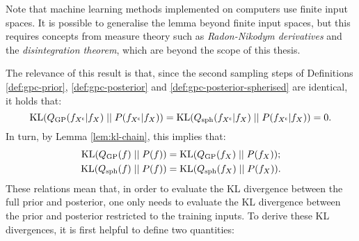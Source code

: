 \begin{refsection}
Note that machine learning methods implemented on computers use finite input spaces. It is possible to generalise the lemma beyond finite input spaces, but this requires concepts from measure theory such as \textit{Radon-Nikodym derivatives} and the \textit{disintegration theorem}, which are beyond the scope of this thesis.

The relevance of this result is that, since the second sampling steps of Definitions \ref{def:gpc-prior}, \ref{def:gpc-posterior} and \ref{def:gpc-posterior-spherised} are identical, it holds that:
\begin{equation}
    \mathrm{KL}(Q_\mathrm{GP}(f_{X^\mathsf{c}} | f_X)\;||\;P(f_{X^\mathsf{c}}| f_X))=\mathrm{KL}(Q_\mathrm{sph}(f_{X^\mathsf{c}} | f_X)\;||\;P(f_{X^\mathsf{c}}| f_X)) = 0.
\end{equation}
In turn, by Lemma \ref{lem:kl-chain}, this implies that:
\begin{align}
    \mathrm{KL}(Q_\mathrm{GP}(f)\;||\;P(f)) &= \mathrm{KL}(Q_\mathrm{GP}(f_X)\;||\;P(f_X)); \\
    \mathrm{KL}(Q_\mathrm{sph}(f)\;||\;P(f)) &= \mathrm{KL}(Q_\mathrm{sph}(f_X)\;||\;P(f_X)).
\end{align}
These relations mean that, in order to evaluate the KL divergence between the full prior and posterior, one only needs to evaluate the KL divergence between the prior and posterior restricted to the training inputs. To derive these KL divergences, it is first helpful to define two quantities:


\end{refsection}
